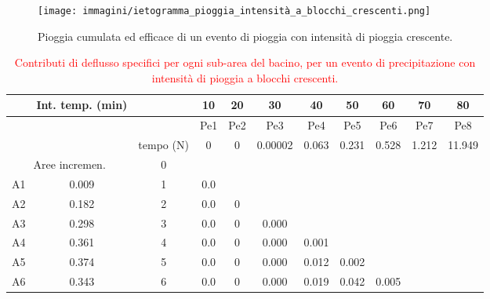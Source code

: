 \begin{figure}[H]  \centering
        \texttt{[image: immagini/ietogramma\_pioggia\_intensità\_a\_blocchi\_crescenti.png]}
        \caption{Pioggia cumulata ed efficace di un evento di pioggia con intensità di pioggia crescente.}
        \label{ietogramma_pioggia_intensità_a_blocchi_crescenti}
\end{figure}

\begin{table}[H] \centering
    \caption{\textcolor{red}{Contributi di deflusso specifici per ogni sub-area del bacino, per un evento di precipitazione con intensità di pioggia a blocchi crescenti.}}
    \begin{tabular}{ccccccccccc}
    \toprule
    & Int. temp. (min) &  & 10  & 20  & 30      & 40                & 50                & 60                & 70               & 80     \\
\midrule
 & & & Pe1 & Pe2 & Pe3     & Pe4 & Pe5   & Pe6 & Pe7   & Pe8    \\
    &    & tempo (N) & 0   & 0   & 0.00002 & 0.063 & 0.231 & 0.528 & 1.212 & 11.949 \\
    \multicolumn{2}{c}{Aree incremen.}  & 0         &     &     &         &                   &                   &                   &                  &        \\
    A1        & 0.009                      & 1         & 0.0 &     &         &                   &                   &                   &                  &        \\
    A2        & 0.182                      & 2         & 0.0 & 0   &         &                   &                   &                   &                  &        \\
    A3        & 0.298                      & 3         & 0.0 & 0   & 0.000   &                   &                   &                   &                  &        \\
    A4        & 0.361                      & 4         & 0.0 & 0   & 0.000   & 0.001             &                   &                   &                  &        \\
    A5        & 0.374                      & 5         & 0.0 & 0   & 0.000   & 0.012             & 0.002             &                   &                  &        \\
    A6        & 0.343                      & 6         & 0.0 & 0   & 0.000   & 0.019             & 0.042             & 0.005             &                  &        \\

\end{tabular}
\end{table}
